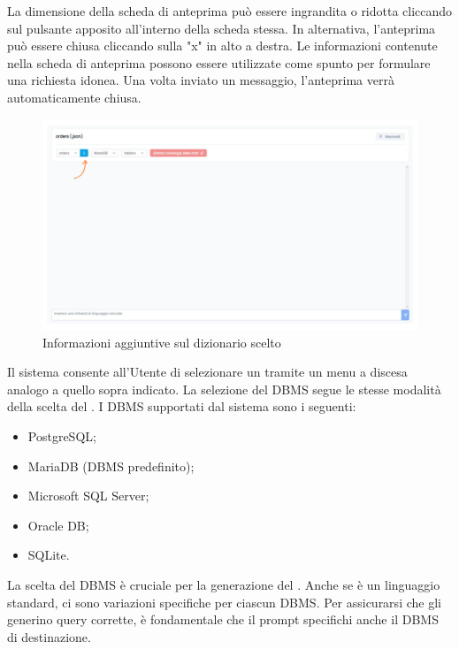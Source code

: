 \vspace{0.5\baselineskip}
\par La dimensione della scheda di anteprima può essere ingrandita o ridotta cliccando sul pulsante apposito all'interno della scheda stessa. In alternativa, l'anteprima può essere chiusa cliccando sulla "x" in alto a destra. Le informazioni contenute nella scheda di anteprima possono essere utilizzate come spunto per formulare una richiesta idonea. Una volta inviato un messaggio, l'anteprima verrà automaticamente chiusa.

\begin{figure}[H]
  \centering
  \includegraphics[width=\textwidth]{assets/info_dizionario.png}
  \caption{Informazioni aggiuntive sul dizionario scelto}
\end{figure}


\par Il sistema consente all'Utente di selezionare un  tramite un menu a discesa analogo a quello sopra indicato. La selezione del DBMS segue le stesse modalità della scelta del . I DBMS supportati dal sistema sono i seguenti:
\begin{itemize}
  \item PostgreSQL;
  \item MariaDB (DBMS predefinito);
  \item Microsoft SQL Server;
  \item Oracle DB;
  \item SQLite.
\end{itemize}

\vspace{0.5\baselineskip}
\par La scelta del DBMS è cruciale per la generazione del . Anche se  è un linguaggio standard, ci sono variazioni specifiche per ciascun DBMS. Per assicurarsi che gli  generino query corrette, è fondamentale che il prompt specifichi anche il DBMS di destinazione.

